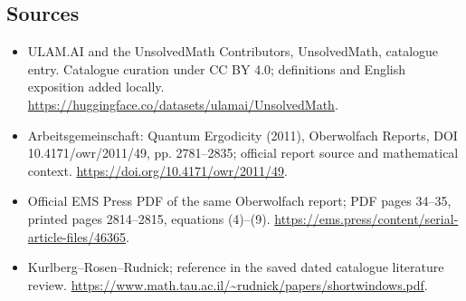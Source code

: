 \documentclass[11pt]{article}
\begin{document}
\subsection{Sources}
\begin{itemize}
\item[\hypertarget{source:statement:1}{S1}] ULAM.AI and the UnsolvedMath Contributors, UnsolvedMath, catalogue entry. Catalogue curation under CC BY 4.0; definitions and English exposition added locally.
\url{https://huggingface.co/datasets/ulamai/UnsolvedMath}.
\item[\hypertarget{source:statement:2}{S2}] Arbeitsgemeinschaft: Quantum Ergodicity (2011), Oberwolfach Reports, DOI 10.4171/owr/2011/49, pp. 2781--2835; official report source and mathematical context.
\url{https://doi.org/10.4171/owr/2011/49}.
\item[\hypertarget{source:statement:3}{S3}] Official EMS Press PDF of the same Oberwolfach report; PDF pages 34--35, printed pages 2814--2815, equations (4)--(9).
\url{https://ems.press/content/serial-article-files/46365}.
\item[\hypertarget{source:statement:4}{S4}] Kurlberg--Rosen--Rudnick; reference in the saved dated catalogue literature review.
\url{https://www.math.tau.ac.il/~rudnick/papers/shortwindows.pdf}.
\end{itemize}
\label{end:statement}
\end{document}
